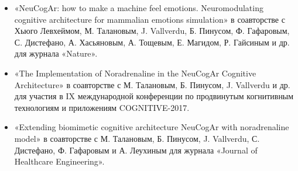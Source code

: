 \begin{itemize}
\item «NeuCogAr: how to make a machine feel emotions. Neuromodulating cognitive architecture for mammalian emotions simulation» в соавторстве с Хьюго Левхеймом, М. Талановым, J. Vallverdu, Б. Пинусом, Ф. Гафаровым, С. Дистефано, А. Хасьяновым, А. Тощевым, Е. Магидом, Р. Гайсиным и др. для журнала «Nature».
\item «The Implementation of Noradrenaline in the NeuCogAr Cognitive Architecture» в соавторстве с М. Талановым, Б. Пинусом, J. Vallverdu и др. для участия в IX международной конференции по продвинутым когнитивным технологиям и приложениям COGNITIVE-2017.
\item «Extending biomimetic cognitive architecture NeuCogAr with noradrenaline model» в соавторстве с М. Талановым, Б. Пинусом, J. Vallverdu, С. Дистефано, Ф. Гафаровым и А. Леухиным для журнала «Journal of Healthcare Engineering».
\end{itemize}